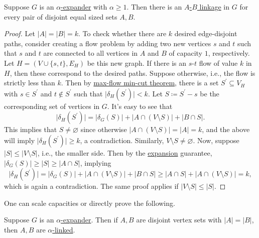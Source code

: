 \begin{lemma}\label{lma:expander-linkage}
	Suppose \(G\) is an \hyperref[def:expander]{\(\alpha \)-expander} with \(\alpha \geq 1\). Then there is an \hyperref[def:linkage]{\(A\)-\(B\) linkage} in \(G\) for every pair of disjoint equal sized sets \(A, B\).
\end{lemma}
\begin{proof}
	Let \(\lvert A \rvert = \lvert B \rvert = k\). To check whether there are \(k\) desired edge-disjoint paths, consider creating a flow problem by adding two new vertices \(s\) and \(t\) such that \(s\) and \(t\) are connected to all vertices in \(A\) and \(B\) of capacity \(1\), respectively. Let \(H = (V \cup \{ s, t \} , E_H)\) be this new graph. If there is an \(s\)-\(t\) flow of value \(k\) in \(H\), then these correspond to the desired paths. Suppose otherwise, i.e., the flow is strictly less than \(k\). Then by \hyperref[thm:max-flow-min-cut]{max-flow min-cut theorem}, there is a set \(S^{\prime} \subseteq V_H\) with \(s \in S^{\prime} \) and \(t \notin S^{\prime} \) such that \(\lvert \delta _H(S^{\prime} ) \rvert < k\). Let \(S \coloneqq S^{\prime}  - s\) be the corresponding set of vertices in \(G\). It's easy to see that
	\[
		\lvert \delta _H(S^{\prime} ) \rvert
		= \lvert \delta _G(S) \rvert + \lvert A \cap (V\setminus S) \rvert + \lvert B \cap S \rvert.
	\]
	This implies that \(S \neq \varnothing \) since otherwise \(\lvert A \cap (V\setminus S) \rvert = \lvert A \rvert = k\), and the above will imply \(\lvert \delta _H(S^{\prime} ) \rvert \geq k\), a contradiction. Similarly, \(V\setminus S \neq \varnothing \). Now, suppose \(\lvert S \rvert \leq \lvert V\setminus S \rvert \), i.e., the smaller side. Then by the \hyperref[def:expansion]{expansion} guarantee, \(\lvert \delta _G(S) \rvert \geq \lvert S \rvert \geq \lvert A \cap S \rvert \), implying
	\[
		\lvert \delta _H(S^{\prime} ) \rvert
		= \lvert \delta _G(S) \rvert + \lvert A \cap (V\setminus S) \rvert + \lvert B \cap S \rvert
		\geq \lvert A \cap S \rvert + \lvert A \cap (V\setminus S) \rvert
		= k,
	\]
	which is again a contradiction. The same proof applies if \(\lvert V \setminus S \rvert \leq \lvert S \rvert \).
\end{proof}

One can scale capacities or directly prove the following.

\begin{corollary}\label{col:expander-linkage}
	Suppose \(G\) is an \hyperref[def:expander]{\(\alpha \)-expander}. Then if \(A, B\) are disjoint vertex sets with \(\lvert A \rvert = \lvert B \rvert \), then \(A, B\) are \hyperref[def:fractional-linkage]{\(\alpha \)-linked}.
\end{corollary}

